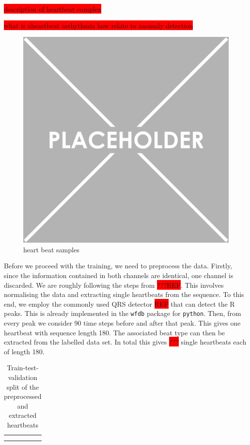 \colorbox{red}{description of heartbeat complex}

\colorbox{red}{what is aheartbeat arrhythmia how relate to anomaly detection}

\begin{figure}[h]
    \centering
    \includegraphics[scale=0.5]{../images/placeholder.png}
    \caption[short]{heart beat samples}
\end{figure}

Before we proceed with the training, we need to preprocess the data. Firstly, since the information contained in both channels are identical, one channel is discarded. We are roughly following the steps from \colorbox{red}{???REF}. This involves normalising the data and extracting single heartbeats from the sequence. To this end, we employ the commonly used QRS detector \colorbox{red}{REF} that can detect the R peaks. This is already implemented in the \texttt{wfdb} package for \texttt{python}. Then, from every peak we consider 90 time steps before and after that peak. This gives one heartbeat with sequence length 180. The associated beat type can then be extracted from the labelled data set. In total this gives \colorbox{red}{???} single heartbeats each of length 180. 

\begin{table}[h]
    \centering
    \begin{tabular}{c|c}
        & \\ 
        &
    \end{tabular}
    \caption{Train-test-validation split of the preprocessed and extracted heartbeats}
    \label{tab:train-test-val}
\end{table}

